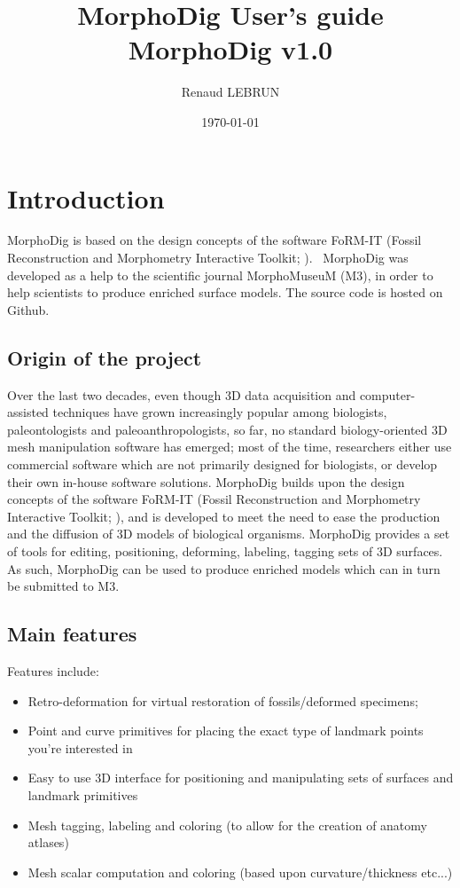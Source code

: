 \documentclass[12pt, a4paper]{book}
\title{MorphoDig User's guide\\MorphoDig v1.0}
\author{Renaud LEBRUN}
\affil{Institut des Sciences de l'Evolution, University of Montpellier, France}
\date{\today}
\begin{document}
	\dominitoc

\maketitle
 

\tableofcontents

\chapter*{Introduction}


\minitoc 

 MorphoDig is based on the design concepts of the software FoRM-IT (Fossil Reconstruction and Morphometry Interactive Toolkit; \citep{Zollikofer1995,Zollikofer2005}).
\ MorphoDig\citep{Lebrun2014} was developed as a help to the scientific journal MorphoMuseuM (M3), in order to help scientists to produce enriched surface models. The source code is hosted on Github.   
\section*{Origin of the project}
Over the last two decades, even though 3D data acquisition and computer-assisted techniques have grown increasingly popular among biologists, paleontologists and paleoanthropologists, so far, no standard biology-oriented 3D mesh manipulation software has emerged; most of the time, researchers either use commercial software which are not primarily designed for biologists, or develop their own in-house software solutions.  MorphoDig builds upon the design concepts of the software FoRM-IT (Fossil Reconstruction and Morphometry Interactive Toolkit; \citep{Zollikofer1995,Zollikofer2005}), and is developed to meet the need to ease the production and the diffusion of 3D models of biological organisms. MorphoDig provides a set of tools for editing, positioning, deforming, labeling, tagging sets of 3D surfaces. As such, MorphoDig can be used to produce enriched models which can in turn be submitted to M3.
\section*{Main features}
Features include:
\begin{itemize}
\item Retro-deformation for virtual restoration of fossils/deformed specimens;
\item Point and curve primitives for placing the exact type of landmark points you’re interested in
\item Easy to use 3D interface for positioning and manipulating sets of surfaces and landmark primitives
\item Mesh tagging, labeling and coloring (to allow for the creation of anatomy atlases)
\item Mesh scalar computation and coloring (based upon curvature/thickness etc...)
\end{itemize}
\end{document}
